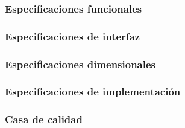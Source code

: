 \documentclass[../../../main.tex]{subfiles}
\begin{document}
\subsubsection{Especificaciones funcionales}\label{subsubsec:funcionales}


\subsubsection{Especificaciones de interfaz}\label{subsubsec:interfaz}


\subsubsection{Especificaciones dimensionales}\label{subsubsec:dimensionales}


\subsubsection{Especificaciones de implementación}\label{subsubsec:implementacion}


\subsubsection{Casa de calidad}\label{subsubsec:casa_calidad}

\end{document}
